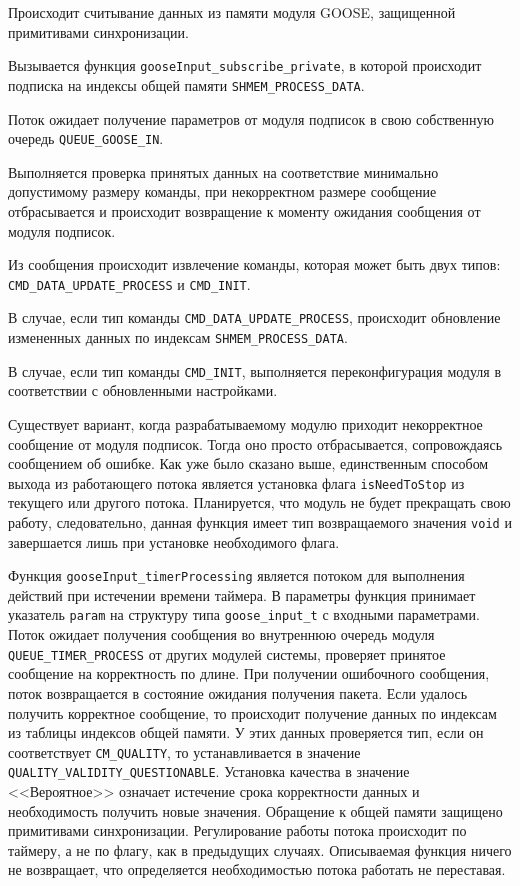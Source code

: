 \begin{enumerate_num}
    \item Происходит считывание данных из памяти модуля GOOSE, защищенной примитивами синхронизации.
    \item Вызывается функция \lstinline{gooseInput_subscribe_private}, в которой происходит подписка на индексы общей памяти \lstinline{SHMEM_PROCESS_DATA}.
    \item Поток ожидает получение параметров от модуля подписок в свою собственную очередь \lstinline{QUEUE_GOOSE_IN}.
    \item Выполняется проверка принятых данных на соответствие минимально допустимому размеру команды, при некорректном размере сообщение отбрасывается и происходит возвращение к моменту ожидания сообщения от модуля подписок.
    \item Из сообщения происходит извлечение команды, которая может быть двух типов: \lstinline{CMD_DATA_UPDATE_PROCESS} и \lstinline{CMD_INIT}.
    \item В случае, если тип команды \lstinline{CMD_DATA_UPDATE_PROCESS}, происходит обновление измененных данных по индексам \lstinline{SHMEM_PROCESS_DATA}.
    \item В случае, если тип команды \lstinline{CMD_INIT}, выполняется переконфигурация модуля в соответствии с обновленными настройками.
\end{enumerate_num}

Существует вариант, когда разрабатываемому модулю приходит некорректное сообщение от модуля подписок. Тогда оно просто отбрасывается, сопровождаясь сообщением об ошибке. Как уже было сказано выше, единственным способом выхода из работающего потока является установка флага \lstinline{isNeedToStop} из текущего или другого потока. Планируется, что модуль не будет прекращать свою работу, следовательно, данная функция имеет тип возвращаемого значения \lstinline{void} и завершается лишь при установке необходимого флага.

Функция \lstinline{gooseInput_timerProcessing} является потоком для выполнения действий при истечении времени таймера. В параметры функция принимает указатель \lstinline{param} на структуру типа \lstinline{goose_input_t} с входными параметрами. Поток ожидает получения сообщения во внутреннюю очередь модуля \lstinline{QUEUE_TIMER_PROCESS} от других модулей системы, проверяет принятое сообщение на корректность по длине. При получении ошибочного сообщения, поток возвращается в состояние ожидания получения пакета. Если удалось получить корректное сообщение, то происходит получение данных по индексам из таблицы индексов общей памяти. У этих данных проверяется тип, если он соответствует \lstinline{CM_QUALITY}, то устанавливается в значение \lstinline{QUALITY_VALIDITY_QUESTIONABLE}.
Установка качества в значение <<Вероятное>> означает истечение срока корректности данных и необходимость получить новые значения.
Обращение к общей памяти защищено примитивами синхронизации. Регулирование работы потока происходит по таймеру, а не по флагу, как в предыдущих случаях. Описываемая функция ничего не возвращает, что определяется необходимостью потока работать не переставая.

